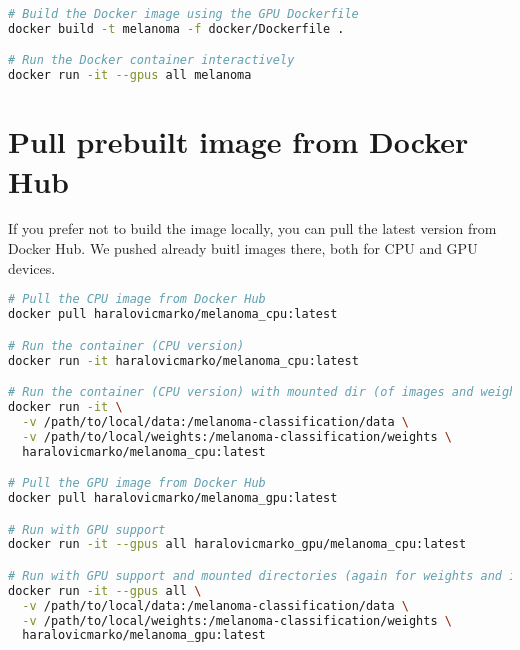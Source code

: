 \begin{lstlisting}[language=bash, caption={Build and run Docker container (GPU version)}]
# Build the Docker image using the GPU Dockerfile
docker build -t melanoma -f docker/Dockerfile .

# Run the Docker container interactively
docker run -it --gpus all melanoma
\end{lstlisting}



\section{Pull prebuilt image from Docker Hub}
If you prefer not to build the image locally, you can pull the latest version from Docker Hub. We pushed already buitl images there, both for CPU and GPU devices. 

\begin{lstlisting}[language=bash, caption={Pull and run the Docker image from Docker Hub}, label=list:docker_hub]
# Pull the CPU image from Docker Hub
docker pull haralovicmarko/melanoma_cpu:latest

# Run the container (CPU version)
docker run -it haralovicmarko/melanoma_cpu:latest

# Run the container (CPU version) with mounted dir (of images and weights for example)
docker run -it \
  -v /path/to/local/data:/melanoma-classification/data \
  -v /path/to/local/weights:/melanoma-classification/weights \
  haralovicmarko/melanoma_cpu:latest

# Pull the GPU image from Docker Hub
docker pull haralovicmarko/melanoma_gpu:latest

# Run with GPU support 
docker run -it --gpus all haralovicmarko_gpu/melanoma_cpu:latest

# Run with GPU support and mounted directories (again for weights and images dir)
docker run -it --gpus all \
  -v /path/to/local/data:/melanoma-classification/data \
  -v /path/to/local/weights:/melanoma-classification/weights \
  haralovicmarko/melanoma_gpu:latest
  
\end{lstlisting}
